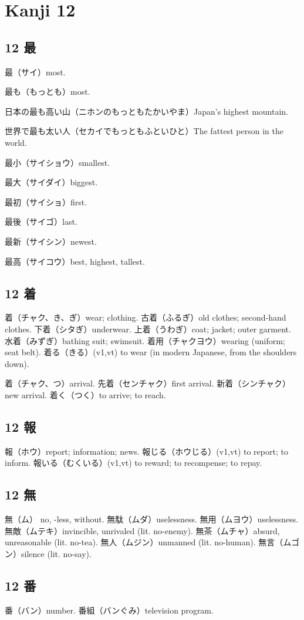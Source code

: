 \chapter{Kanji 12}

\section{12 最}

最（サイ）most.

最も（もっとも）most.

日本の最も高い山（ニホンのもっともたかいやま）Japan's highest mountain.

世界で最も太い人（セカイでもっともふといひと）The fattest person in the world.

最小（サイショウ）smallest.

最大（サイダイ）biggest.

最初（サイショ）first.

最後（サイゴ）last.

最新（サイシン）newest.

最高（サイコウ）best, highest, tallest.

\section{12 着}

着（チャク、き、ぎ）wear; clothing.
古着（ふるぎ）old clothes; second-hand clothes.
下着（シタぎ）underwear.
上着（うわぎ）coat; jacket; outer garment.
水着（みずぎ）bathing suit; swimsuit.
着用（チャクヨウ）wearing (uniform; seat belt).
着る（きる）(v1,vt) to wear (in modern Japanese, from the shoulders down).

着（チャク、つ）arrival.
先着（センチャク）first arrival.
新着（シンチャク）new arrival.
着く（つく）to arrive; to reach.

\section{12 報}

報（ホウ）report; information; news.
報じる（ホウじる）(v1,vt) to report; to inform.
報いる（むくいる）(v1,vt) to reward; to recompense; to repay.

\section{12 無}

無（ム） no, -less, without.
無駄（ムダ）uselessness.
無用（ムヨウ）uselessness.
無敵（ムテキ）invincible, unrivaled (lit. no-enemy).
無茶（ムチャ）absurd, unreasonable (lit. no-tea).
無人（ムジン）unmanned (lit. no-human).
無言（ムゴン）silence (lit. no-say).

\section{12 番}

番（バン）number.
番組（バンぐみ）television program.
